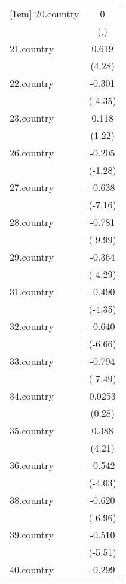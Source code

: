 {\begin{tabular}{l*{1}{c}}
[1em]
20.country  &           0         \\
            &         (.)         \\
[1em]
21.country  &       0.619\sym{***}\\
            &      (4.28)         \\
[1em]
22.country  &      -0.301\sym{***}\\
            &     (-4.35)         \\
[1em]
23.country  &       0.118         \\
            &      (1.22)         \\
[1em]
26.country  &      -0.205         \\
            &     (-1.28)         \\
[1em]
27.country  &      -0.638\sym{***}\\
            &     (-7.16)         \\
[1em]
28.country  &      -0.781\sym{***}\\
            &     (-9.99)         \\
[1em]
29.country  &      -0.364\sym{***}\\
            &     (-4.29)         \\
[1em]
31.country  &      -0.490\sym{***}\\
            &     (-4.35)         \\
[1em]
32.country  &      -0.640\sym{***}\\
            &     (-6.66)         \\
[1em]
33.country  &      -0.794\sym{***}\\
            &     (-7.49)         \\
[1em]
34.country  &      0.0253         \\
            &      (0.28)         \\
[1em]
35.country  &       0.388\sym{***}\\
            &      (4.21)         \\
[1em]
36.country  &      -0.542\sym{***}\\
            &     (-4.03)         \\
[1em]
38.country  &      -0.620\sym{***}\\
            &     (-6.96)         \\
[1em]
39.country  &      -0.510\sym{***}\\
            &     (-5.51)         \\
[1em]
40.country  &      -0.299\sym{***}\\

\end{tabular}}
